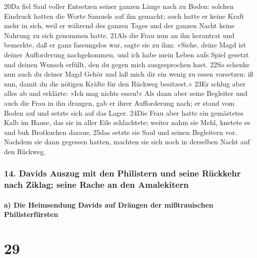 20Da fiel Saul voller Entsetzen seiner ganzen Länge nach zu Boden:
solchen Eindruck hatten die Worte Samuels auf ihn gemacht; auch hatte er
keine Kraft mehr in sich, weil er während des ganzen Tages und der
ganzen Nacht keine Nahrung zu sich genommen hatte. 21Als die Frau nun an
ihn herantrat und bemerkte, daß er ganz fassungslos war, sagte sie zu
ihm: »Siehe, deine Magd ist deiner Aufforderung nachgekommen, und ich
habe mein Leben aufs Spiel gesetzt und deinen Wunsch erfüllt, den du
gegen mich ausgesprochen hast. 22So schenke nun auch du deiner Magd
Gehör und laß mich dir ein wenig zu essen vorsetzen: iß nun, damit du
die nötigen Kräfte für den Rückweg besitzest.« 23Er schlug aber alles ab
und erklärte: »Ich mag nichts essen!« Als dann aber seine Begleiter und
auch die Frau in ihn drangen, gab er ihrer Aufforderung nach; er stand
vom Boden auf und setzte sich auf das Lager. 24Die Frau aber hatte ein
gemästetes Kalb im Hause, das sie in aller Eile schlachtete; weiter nahm
sie Mehl, knetete es und buk Brotkuchen daraus; 25das setzte sie Saul
und seinen Begleitern vor. Nachdem sie dann gegessen hatten, machten sie
sich noch in derselben Nacht auf den Rückweg.

\hypertarget{davids-auszug-mit-den-philistern-und-seine-ruxfcckkehr-nach-ziklag-seine-rache-an-den-amalekitern}{%
\subsubsection{14. Davids Auszug mit den Philistern und seine Rückkehr
nach Ziklag; seine Rache an den
Amalekitern}\label{davids-auszug-mit-den-philistern-und-seine-ruxfcckkehr-nach-ziklag-seine-rache-an-den-amalekitern}}

\hypertarget{a-die-heimsendung-davids-auf-druxe4ngen-der-miuxdftrauischen-philisterfuxfcrsten}{%
\paragraph{a) Die Heimsendung Davids auf Drängen der mißtrauischen
Philisterfürsten}\label{a-die-heimsendung-davids-auf-druxe4ngen-der-miuxdftrauischen-philisterfuxfcrsten}}

\hypertarget{section-28}{%
\section{29}\label{section-28}}


